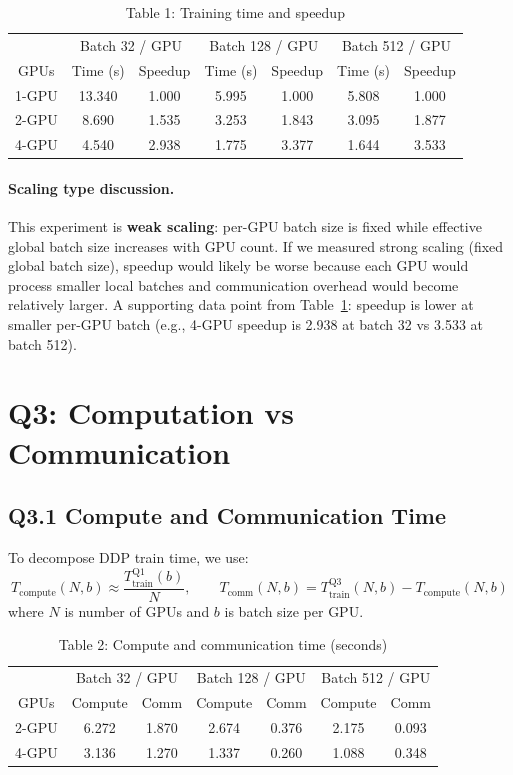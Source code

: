 \documentclass[11pt]{article}
\begin{document}
\begin{table}[h]
\centering
\caption{Table 1: Training time and speedup}
\label{tab:q2}
\begin{tabular}{c|cc|cc|cc}
\toprule
 & \multicolumn{2}{c|}{Batch 32 / GPU} & \multicolumn{2}{c|}{Batch 128 / GPU} & \multicolumn{2}{c}{Batch 512 / GPU} \\
GPUs & Time (s) & Speedup & Time (s) & Speedup & Time (s) & Speedup \\
\midrule
1-GPU & 13.340 & 1.000 & 5.995 & 1.000 & 5.808 & 1.000 \\
2-GPU & 8.690  & 1.535 & 3.253 & 1.843 & 3.095 & 1.877 \\
4-GPU & 4.540  & 2.938 & 1.775 & 3.377 & 1.644 & 3.533 \\
\bottomrule
\end{tabular}
\end{table}

\paragraph{Scaling type discussion.}
This experiment is \textbf{weak scaling}: per-GPU batch size is fixed while effective global batch size increases with GPU count.  
If we measured strong scaling (fixed global batch size), speedup would likely be worse because each GPU would process smaller local batches and communication overhead would become relatively larger.  
A supporting data point from Table~\ref{tab:q2}: speedup is lower at smaller per-GPU batch (e.g., 4-GPU speedup is 2.938 at batch 32 vs 3.533 at batch 512).

\section{Q3: Computation vs Communication}
\subsection*{Q3.1 Compute and Communication Time}
To decompose DDP train time, we use:
\[
T_{\text{compute}}(N,b)\approx \frac{T^{\text{Q1}}_{\text{train}}(b)}{N},\qquad
T_{\text{comm}}(N,b)=T^{\text{Q3}}_{\text{train}}(N,b)-T_{\text{compute}}(N,b)
\]
where $N$ is number of GPUs and $b$ is batch size per GPU.

\begin{table}[h]
\centering
\caption{Table 2: Compute and communication time (seconds)}
\label{tab:q3_1}
\begin{tabular}{c|cc|cc|cc}
\toprule
 & \multicolumn{2}{c|}{Batch 32 / GPU} & \multicolumn{2}{c|}{Batch 128 / GPU} & \multicolumn{2}{c}{Batch 512 / GPU} \\
GPUs & Compute & Comm & Compute & Comm & Compute & Comm \\
\midrule
2-GPU & 6.272 & 1.870 & 2.674 & 0.376 & 2.175 & 0.093 \\
4-GPU & 3.136 & 1.270 & 1.337 & 0.260 & 1.088 & 0.348 \\
\bottomrule
\end{tabular}
\end{table}
\end{document}
